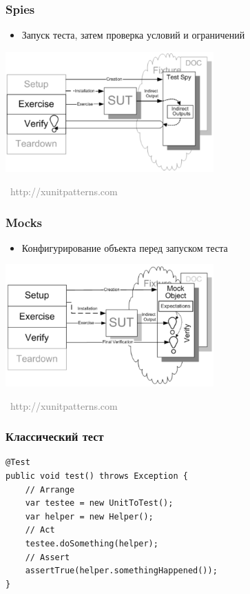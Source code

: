 \documentclass[xetex,mathserif,serif]{beamer}
\newcommand{\attribution}[1] {
\vspace{-5mm}\begin{flushright}\begin{scriptsize}\textcolor{gray}{\textcopyright\, #1}\end{scriptsize}\end{flushright}
}
\begin{document}
	\begin{frame}
		\frametitle{Spies}
		\begin{itemize}
			\item Запуск теста, затем проверка условий и ограничений
		\end{itemize}
		\begin{center}
			\includegraphics[width=0.6\textwidth]{spy.png}
			\attribution{http://xunitpatterns.com}
		\end{center}
	\end{frame}

	\begin{frame}
		\frametitle{Mocks}
		\begin{itemize}
			\item Конфигурирование объекта перед запуском теста
		\end{itemize}
		\begin{center}
			\includegraphics[width=0.6\textwidth]{mock.png}
			\attribution{http://xunitpatterns.com}
		\end{center}
	\end{frame}

	\begin{frame}[fragile]
		\frametitle{Классический тест}
		\begin{verbatim}
@Test 
public void test() throws Exception {
    // Arrange
    var testee = new UnitToTest();
    var helper = new Helper();
    // Act
    testee.doSomething(helper);
    // Assert
    assertTrue(helper.somethingHappened());
}
		\end{verbatim}
	\end{frame}
\end{document}
